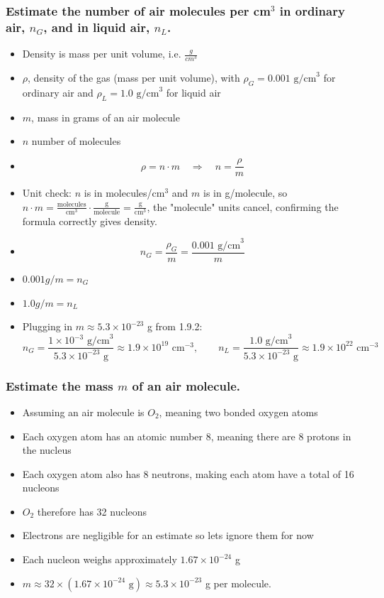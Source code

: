 \documentclass{article}
\begin{document}
\subsubsection{Estimate the number of air molecules per cm$^3$ in ordinary air, $n_G$, and in liquid air, $n_L$.}
\begin{itemize}
    \item Density is mass per unit volume, i.e. $\frac{g}{cm^3}$
    \item $\rho$, density of the gas (mass per unit volume), with $\rho_G = 0.001\text{ g/cm}^3$ for ordinary air and $\rho_L = 1.0\text{ g/cm}^3$ for liquid air
    \item $m$, mass in grams of an air molecule
    \item $n$ number of molecules
    \item $$\rho = n \cdot m \quad\Rightarrow\quad n = \frac{\rho}{m}$$
    \item Unit check: $n$ is in molecules/cm$^3$ and $m$ is in g/molecule, so $n \cdot m = \frac{\text{molecules}}{\text{cm}^3}\cdot\frac{\text{g}}{\text{molecule}} = \frac{\text{g}}{\text{cm}^3}$, the "molecule" units cancel, confirming the formula correctly gives density.
    \item $$n_G = \frac{\rho_G}{m} = \frac{0.001 \text{ g/cm}^3}{m}$$
    \item $0.001g/m = n_G$
    \item $1.0g/m = n_L$
    \item Plugging in $m \approx 5.3\times10^{-23}$ g from 1.9.2: $$n_G = \frac{1\times10^{-3}\text{ g/cm}^3}{5.3\times10^{-23}\text{ g}} \approx 1.9\times10^{19}\text{ cm}^{-3}, \qquad n_L = \frac{1.0\text{ g/cm}^3}{5.3\times10^{-23}\text{ g}} \approx 1.9\times10^{22}\text{ cm}^{-3}$$
\end{itemize}

\subsubsection{Estimate the mass $m$ of an air molecule.}
\begin{itemize}
    \item Assuming an air molecule is $O_2$, meaning two bonded oxygen atoms
    \item Each oxygen atom has an atomic number 8, meaning there are 8 protons in the nucleus
    \item Each oxygen atom also has 8 neutrons, making each atom have a total of 16 nucleons
    \item $O_2$ therefore has 32 nucleons
    \item Electrons are negligible for an estimate so lets ignore them for now
    \item Each nucleon weighs approximately $1.67 \times 10^{-24}$ g
    \item $m \approx 32 \times (1.67\times10^{-24}\text{ g}) \approx 5.3\times 10^{-23}$ g per molecule.
\end{itemize}
\end{document}
